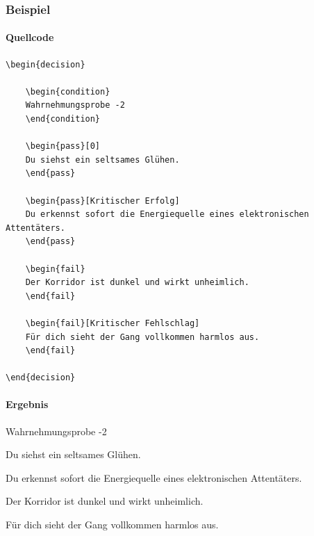\subsubsection*{Beispiel}

\paragraph{Quellcode}

\begin{Verbatim}
\begin{decision}

    \begin{condition}
    Wahrnehmungsprobe -2
    \end{condition}

    \begin{pass}[0]
    Du siehst ein seltsames Glühen.
    \end{pass}

    \begin{pass}[Kritischer Erfolg]
    Du erkennst sofort die Energiequelle eines elektronischen Attentäters.
    \end{pass}

    \begin{fail}
    Der Korridor ist dunkel und wirkt unheimlich.
    \end{fail}

    \begin{fail}[Kritischer Fehlschlag]
    Für dich sieht der Gang vollkommen harmlos aus.
    \end{fail}

\end{decision}
\end{Verbatim}

\paragraph{Ergebnis}

\begin{decision}

    \begin{condition}
    Wahrnehmungsprobe -2
    \end{condition}

    \begin{pass}[0]
    Du siehst ein seltsames Glühen.
    \end{pass}

    \begin{pass}
    Du erkennst sofort die Energiequelle eines elektronischen Attentäters.
    \end{pass}

    \begin{fail}
    Der Korridor ist dunkel und wirkt unheimlich.
    \end{fail}

    \begin{fail}
    Für dich sieht der Gang vollkommen harmlos aus.
    \end{fail}

\end{decision}



